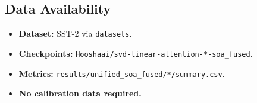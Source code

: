\subsection{Data Availability}

\begin{itemize}
\item \textbf{Dataset:} SST-2 via \texttt{datasets}.
\item \textbf{Checkpoints:} \texttt{Hooshaai/svd-linear-attention-*-soa\_fused}.
\item \textbf{Metrics:} \texttt{results/unified\_soa\_fused/*/summary.csv}.
\item \textbf{No calibration data required.}

\end{itemize}
